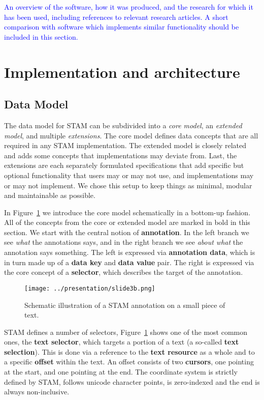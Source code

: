 \documentclass{jors}
\begin{document}
\textcolor{blue}{An overview of the software, how it was produced, and the
research for which it has been used, including references to relevant research
articles. A short comparison with software which implements similar
functionality should be included in this section. }

\section*{Implementation and architecture}

\subsection*{Data Model}

The data model for STAM can be subdivided into a \emph{core model}, an
\emph{extended model}, and multiple \emph{extensions}. The core model defines
data concepts that are all required in any STAM implementation. The extended
model is closely related and adds some concepts that implementations may
deviate from. Last, the extensions are each separately formulated
specifications that add specific but optional functionality that users may or
may not use, and implementations may or may not implement. We chose this setup
to keep things as minimal, modular and maintainable as possible.

In Figure~\ref{fig:modelintro} we introduce the core model schematically in a
bottom-up fashion. All of the concepts from the core or extended model are
marked in bold in this section. We start with the central notion of
\textbf{annotation}. In the left branch we see \emph{what} the annotations
says, and in the right branch we see \emph{about what} the annotation says
something. The left is expressed via \textbf{annotation
data}, which is in turn made up of a \textbf{data key} and \textbf{data value} pair.
The right is expressed via the core concept of a \textbf{selector}, which
describes the target of the annotation.

\begin{figure}[h]
\texttt{[image: ../presentation/slide3b.png]}
\caption{Schematic illustration of a STAM annotation on a small piece of text.}
\label{fig:modelintro}
\end{figure}

STAM defines a number of selectors, Figure~\ref{fig:modelintro} shows one of
the most common ones, the \textbf{text selector}, which targets a portion of a
text (a so-called \textbf{text selection}). This is done via a reference to the
\textbf{text resource} as a whole and to a specific \textbf{offset} within the
text. An offset consists of two \textbf{cursors}, one pointing at the start,
and one pointing at the end. The coordinate system is strictly defined by STAM,
follows unicode character points, is zero-indexed and the end is always
non-inclusive.
\end{document}
